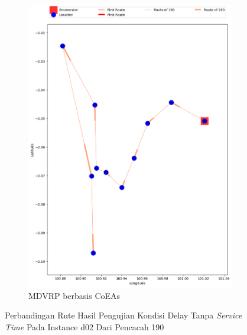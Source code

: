 \begin{figure}[H]
	\centering
	\begin{subfigure}[t]{\textwidth}
		\centering
		\includegraphics[width=\textwidth]{Resources/Images/delayed_2/real_m15_n100_delayed_2_190_coes}
		\caption{MDVRP berbasis CoEAs}
		\label{fig:real_m15_n100_delayed_2_190_coes}
	\end{subfigure}
	\caption{Perbandingan Rute Hasil Pengujian Kondisi Delay Tanpa \textit{Service Time} Pada Instance d02 Dari Pencacah 190}
	\label{fig:real_m15_n100_delayed_2_190}
\end{figure}


